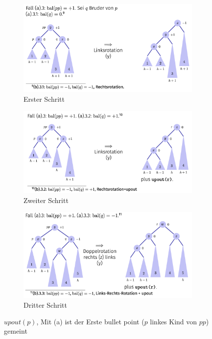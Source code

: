 \documentclass[a4paper]{article}
\begin{document}
\begin{figure}[h]
\centering
\begin{subfigure}{0.38\textwidth}
    \includegraphics[width=\textwidth]{Pictures/upout1.png}
        \caption{Erster Schritt}
        \label{fig: upout1}
\end{subfigure}
\hfill
\begin{subfigure}{0.38\textwidth}
 \includegraphics[width=\textwidth]{Pictures/upout2.png}  
 \caption{Zweiter Schritt}
        \label{fig: upout2}
\end{subfigure}

\begin{subfigure}{0.38\textwidth}
 \includegraphics[width=\textwidth]{Pictures/upout3.png}
        \caption{Dritter Schritt}
        \label{fig: upout3}
\end{subfigure}
        
\caption{$upout(p)$, Mit (a) ist der Erste bullet point ($p$ linkes Kind von $pp$) gemeint}
\label{fig: upout(p)}
\end{figure}
\end{document}
